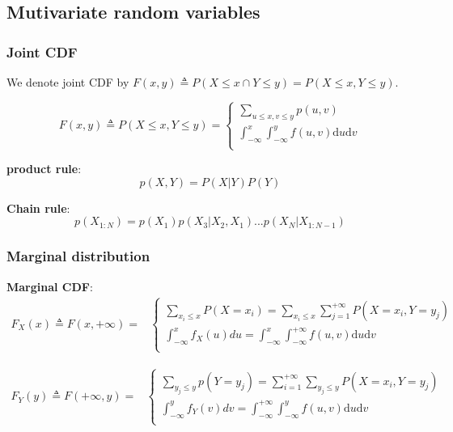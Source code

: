 \subsection{Mutivariate random variables}


\subsubsection{Joint CDF}
We denote joint CDF by $F(x,y) \triangleq P(X \leq x \cap Y \leq y)=P(X \leq x , Y \leq y)$.

\begin{equation}
F(x,y) \triangleq P(X \leq x, Y \leq y)=\begin{cases}
\sum_{u \leq x, v \leq y}p(u,v) \\
\int_{-\infty}^{x}\int_{-\infty}^{y} f(u,v)\mathrm{d}u\mathrm{d}v \\
\end{cases}
\end{equation}

\textbf{product rule}:
\begin{equation}\label{eqn:product-rule}
p(X,Y)=P(X|Y)P(Y)
\end{equation}

\textbf{Chain rule}:
\begin{equation}
p(X_{1:N})=p(X_1)p(X_3|X_2,X_1)...p(X_N|X_{1:N-1})
\end{equation}


\subsubsection{Marginal distribution}
\textbf{Marginal CDF}:
\begin{equation}\begin{split}
F_X(x) \triangleq F(x,+\infty)= 
& \begin{cases}
\sum\limits_{x_i \leq x}P(X=x_i)=\sum\limits_{x_i \leq x}\sum\limits_{j=1}^{+\infty}P(X=x_i,Y=y_j) \\
\int_{-\infty}^{x}f_X(u)du=\int_{-\infty}^{x}\int_{-\infty}^{+\infty} f(u,v)\mathrm{d}u\mathrm{d}v \\
\end{cases}
\end{split}\end{equation}

\begin{equation}\begin{split}
F_Y(y) \triangleq F(+\infty,y)= 
& \begin{cases}
\sum\limits_{y_j \leq y}p(Y=y_j)=\sum\limits_{i=1}^{+\infty}\sum_{y_j \leq y}P(X=x_i,Y=y_j) \\
\int_{-\infty}^{y}f_Y(v)dv=\int_{-\infty}^{+\infty}\int_{-\infty}^{y} f(u,v)\mathrm{d}u\mathrm{d}v \\
\end{cases}
\end{split}\end{equation}

